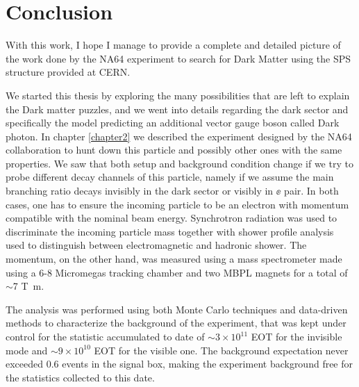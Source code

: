 
\chapter{Conclusion} %

\label{chapter6}

With this work, I hope I manage to provide a complete and detailed picture of the work done by the NA64 experiment to search for Dark Matter using the SPS structure provided at CERN.

We started this thesis by exploring the many possibilities that are left to explain the Dark matter puzzles, and we went into details regarding the dark sector and specifically the model predicting an additional vector gauge boson called Dark photon. In chapter \ref{chapter2} we described the experiment designed by the NA64 collaboration to hunt down this particle and possibly other ones with the same properties. We saw that both setup and background condition change if we try to probe different decay channels of this particle, namely if we assume the main branching ratio decays invisibly in the dark sector or visibly in $\ee$ pair. In both cases, one has to ensure the incoming particle to be an electron with momentum compatible with the nominal beam energy. Synchrotron radiation was used to discriminate the incoming particle mass together with shower profile analysis used to distinguish between electromagnetic and hadronic shower. The momentum, on the other hand, was measured using a mass spectrometer made using a 6-8 Micromegas tracking chamber and two MBPL magnets for a total of $\sim$7 \si{\tesla\meter}.

The analysis was performed using both Monte Carlo techniques and data-driven methods to characterize the background of the experiment, that was kept under control for the statistic accumulated to date of $\sim 3 \times 10^{11}$ EOT for the invisible mode and $\sim 9 \times 10^{10}$ EOT for the visible one. The background expectation never exceeded 0.6 events in the signal box, making the experiment background free for the statistics collected to this date.

